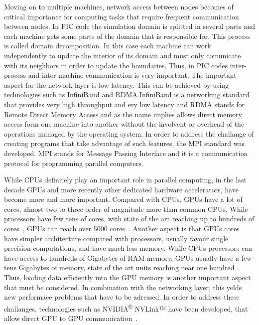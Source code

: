 \documentclass[12pt, class=report, crop=false]{standalone}
\begin{document}
Moving on to multiple machines, network access between nodes becomes of critical
importance for computing tasks that require frequent communication between
nodes. In PIC code the simulation domain is splitted in several parts
and each machine gets some parts of the domain that is responsible for.
This process is called domain decomposition. In this case each machine can
work independently to update the interior of its domain and must only comunicate
with its neighbors in order to update the boundaries. Thus, in PIC codes inter-process
and inter-machine communication is very important. The important aspect for the
network layer is low latency. This can be achieved by using technologies such as
InfiniBand and RDMA.\@ InfiniBand is a networking standard that provides very high
throughput and ery low latency and RDMA stands for Remote Direct Memory Access
and as the name implies allows direct memory access form one machine into another
without the involvent or overhead of the operations managed by the operating system.
In order to address the challange of creating programs that take advantage of such
features, the MPI standard was developed. MPI stands for Message Passing Interface
and it is a communication protocol for programming parallel computers.

While CPUs definitely play an important role in parallel computing, in the last
decade GPUs and more recently other dedicated hardware accelerators, have become
more and more important. Compared with CPUs, GPUs have a lot of cores, almost
two to three order of magnitude more than common CPUs. While processors have
few tens of cores, with state of the art reaching up to hundreds of
cores~\autocite{intelcorporation_intelxeon_2016, ibm_power9servers_2018,
vazhkudai_designdeployment_2018},
GPUs can reach over 5000 cores~\autocite{nvidiacorporation_nvidiatesla_2018}.
Another aspect is that GPUs cores have simpler architecture compared with processors,
usually favour single precision computations, and have much less memory.
While CPUs processors can have access to hundreds of Gigabytes of RAM memory,
GPUs usually have a few tens Gigabytes of memory, state of the art units reaching
near one hundred~\autocite{vazhkudai_designdeployment_2018}.\@
Thus, loading data efficiently into the GPU memory is another important aspect
that must be considered. In combination with the networking layer,
this yelds new performace problems that have to be adressed.
In order to address these challanges, technologies such as
NVIDIA\textsuperscript{®} NVLink™ have been developed, that allow direct
GPU to GPU communication~\autocite{nvidiacorporation_nvidianvlink_2018}.
\end{document}

